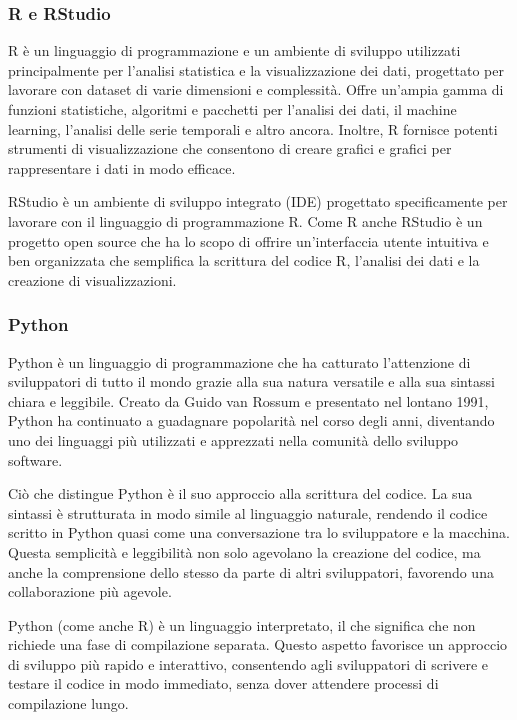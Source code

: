 \subsubsection{R e RStudio}
R è un linguaggio di programmazione e un ambiente di sviluppo utilizzati principalmente per l’analisi statistica e la visualizzazione dei dati, progettato per lavorare con dataset di varie dimensioni e complessità. Offre un'ampia gamma di funzioni statistiche, algoritmi e pacchetti per l'analisi dei dati, il machine learning, l'analisi delle serie temporali e altro ancora. Inoltre, R fornisce potenti strumenti di visualizzazione che consentono di creare grafici e grafici per rappresentare i dati in modo efficace.

RStudio è un ambiente di sviluppo integrato (IDE) progettato specificamente per lavorare con il linguaggio di programmazione R. Come R\cite{installR} anche RStudio\cite{installRstudio} è un progetto open source che ha lo scopo di offrire un'interfaccia utente intuitiva e ben organizzata che semplifica la scrittura del codice R, l'analisi dei dati e la creazione di visualizzazioni.

\subsubsection{Python}
Python\cite{installPython} è un linguaggio di programmazione che ha catturato l'attenzione di sviluppatori di tutto il mondo grazie alla sua natura versatile e alla sua sintassi chiara e leggibile. Creato da Guido van Rossum\cite{wikiPython} e presentato nel lontano 1991, Python ha continuato a guadagnare popolarità nel corso degli anni, diventando uno dei linguaggi più utilizzati e apprezzati nella comunità dello sviluppo software.

Ciò che distingue Python è il suo approccio alla scrittura del codice. La sua sintassi è strutturata in modo simile al linguaggio naturale, rendendo il codice scritto in Python quasi come una conversazione tra lo sviluppatore e la macchina. Questa semplicità e leggibilità non solo agevolano la creazione del codice, ma anche la comprensione dello stesso da parte di altri sviluppatori, favorendo una collaborazione più agevole.

Python (come anche R) è un linguaggio interpretato, il che significa che non richiede una fase di compilazione separata. Questo aspetto favorisce un approccio di sviluppo più rapido e interattivo, consentendo agli sviluppatori di scrivere e testare il codice in modo immediato, senza dover attendere processi di compilazione lungo.
